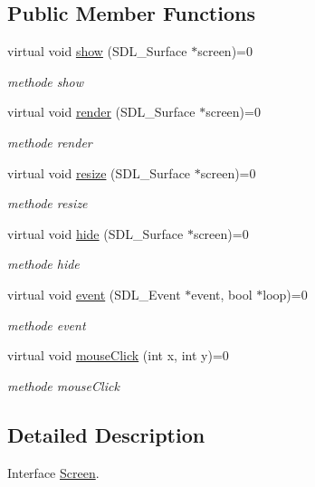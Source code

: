 \subsection*{Public Member Functions}
\begin{DoxyCompactItemize}
\item 
virtual void \hyperlink{classScreen_ae875c48e44e67e4a1e5211337d67577f}{show} (S\-D\-L\-\_\-\-Surface $\ast$screen)=0
\begin{DoxyCompactList}\small\item\em methode show \end{DoxyCompactList}\item 
virtual void \hyperlink{classScreen_a54b82c1f1ba74e82451dde46481c27f1}{render} (S\-D\-L\-\_\-\-Surface $\ast$screen)=0
\begin{DoxyCompactList}\small\item\em methode render \end{DoxyCompactList}\item 
virtual void \hyperlink{classScreen_aae326b09506351ccf22c34a22b8eae40}{resize} (S\-D\-L\-\_\-\-Surface $\ast$screen)=0
\begin{DoxyCompactList}\small\item\em methode resize \end{DoxyCompactList}\item 
virtual void \hyperlink{classScreen_a04c451ca44c902190d9f0c20b5585a69}{hide} (S\-D\-L\-\_\-\-Surface $\ast$screen)=0
\begin{DoxyCompactList}\small\item\em methode hide \end{DoxyCompactList}\item 
virtual void \hyperlink{classScreen_a072825d7520cba6d89beaa4e173a6b81}{event} (S\-D\-L\-\_\-\-Event $\ast$event, bool $\ast$loop)=0
\begin{DoxyCompactList}\small\item\em methode event \end{DoxyCompactList}\item 
virtual void \hyperlink{classScreen_a03916a6d13cebf61e730086ef7650d1e}{mouse\-Click} (int x, int y)=0
\begin{DoxyCompactList}\small\item\em methode mouse\-Click \end{DoxyCompactList}\end{DoxyCompactItemize}


\subsection{Detailed Description}
Interface \hyperlink{classScreen}{Screen}. 

